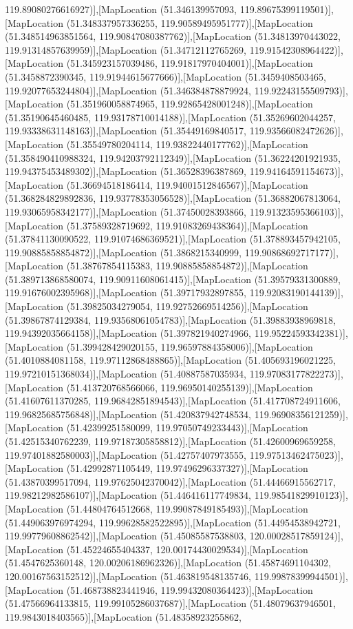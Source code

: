 119.89080276616927)],[MapLocation (51.346139957093, 119.89675399119501)],[MapLocation (51.348337957336255, 119.90589495951777)],[MapLocation (51.348514963851564, 119.90847080387762)],[MapLocation (51.34813970443022, 119.91314857639959)],[MapLocation (51.34712112765269, 119.91542308964422)],[MapLocation (51.345923157039486, 119.91817970404001)],[MapLocation (51.3458872390345, 119.91944615677666)],[MapLocation (51.3459408503465, 119.92077653244804)],[MapLocation (51.346384878879924, 119.92243155509793)],[MapLocation (51.351960058874965, 119.92865428001248)],[MapLocation (51.35190645460485, 119.93178710014188)],[MapLocation (51.35269602044257, 119.93338631148163)],[MapLocation (51.35449169840517, 119.93566082472626)],[MapLocation (51.35549780204114, 119.93822440177762)],[MapLocation (51.358490410988324, 119.94203792112349)],[MapLocation (51.36224201921935, 119.94375453489302)],[MapLocation (51.36528396387869, 119.94164591154673)],[MapLocation (51.36694518186414, 119.94001512846567)],[MapLocation (51.368284829892836, 119.93778353056528)],[MapLocation (51.36882067813064, 119.93065958342177)],[MapLocation (51.37450028393866, 119.91323595366103)],[MapLocation (51.37589328719692, 119.91083269438364)],[MapLocation (51.37841130090522, 119.91074686369521)],[MapLocation (51.378893457942105, 119.90885858854872)],[MapLocation (51.3868215340999, 119.90868692717177)],[MapLocation (51.38767854115383, 119.90885858854872)],[MapLocation (51.389713868580074, 119.90911608061415)],[MapLocation (51.39579331300889, 119.91676002395968)],[MapLocation (51.39717932897855, 119.92083190144139)],[MapLocation (51.39825034279054, 119.92752669514256)],[MapLocation (51.39867874129384, 119.93568061054783)],[MapLocation (51.39883938969818, 119.94392035664158)],[MapLocation (51.397821940274966, 119.95224593342381)],[MapLocation (51.399428429020155, 119.96597884358006)],[MapLocation (51.4010884081158, 119.97112868488865)],[MapLocation (51.405693196021225, 119.97210151368034)],[MapLocation (51.40887587035934, 119.97083177822273)],[MapLocation (51.413720768566066, 119.96950140255139)],[MapLocation (51.41607611370285, 119.96842851894543)],[MapLocation (51.417708724911606, 119.96825685756848)],[MapLocation (51.420837942748534, 119.96908356121259)],[MapLocation (51.42399251580099, 119.97050749233443)],[MapLocation (51.42515340762239, 119.97187305858812)],[MapLocation (51.42600969659258, 119.97401882580003)],[MapLocation (51.42757407973555, 119.97513462475023)],[MapLocation (51.42992871105449, 119.97496296337327)],[MapLocation (51.43870399517094, 119.97625042370042)],[MapLocation (51.44466915562717, 119.98212982586107)],[MapLocation (51.446416117749834, 119.98541829910123)],[MapLocation (51.44804764512668, 119.99087849185493)],[MapLocation (51.449063976974294, 119.99628582522895)],[MapLocation (51.44954538942721, 119.99779608862542)],[MapLocation (51.45085587538803, 120.00028517859124)],[MapLocation (51.45224655404337, 120.00174430029534)],[MapLocation (51.4547625360148, 120.00206186962326)],[MapLocation (51.45874691104302, 120.00167563152512)],[MapLocation (51.463819548135746, 119.99878399944501)],[MapLocation (51.468738823441946, 119.99432080364423)],[MapLocation (51.47566964133815, 119.99105286037687)],[MapLocation (51.48079637946501, 119.9843018403565)],[MapLocation (51.48358923255862, 